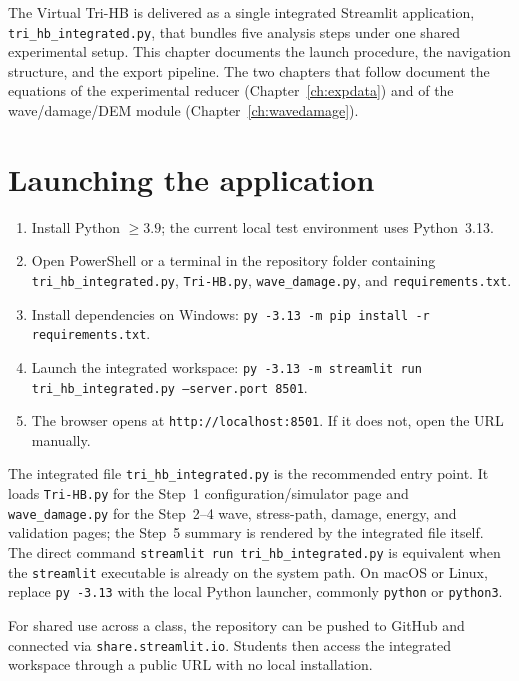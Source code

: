 \documentclass[11pt,a4paper,openany]{book}
\theoremstyle{handbook}
\begin{document}
The Virtual Tri-HB is delivered as a single integrated Streamlit
application, \texttt{tri\_hb\_integrated.py}, that bundles five analysis
steps under one shared experimental setup. This chapter documents the
launch procedure, the navigation structure, and the export pipeline. The
two chapters that follow document the equations of the experimental
reducer (Chapter~\ref{ch:expdata}) and of the wave/damage/DEM module
(Chapter~\ref{ch:wavedamage}).

\section{Launching the application}

\begin{stepbox}
\begin{enumerate}[leftmargin=*,itemsep=3pt]
  \item Install Python $\ge 3.9$; the current local test environment uses
        Python~3.13.
  \item Open PowerShell or a terminal in the repository folder containing
        \texttt{tri\_hb\_integrated.py}, \texttt{Tri-HB.py},
        \texttt{wave\_damage.py}, and \texttt{requirements.txt}.
  \item Install dependencies on Windows:
        \texttt{py -3.13 -m pip install -r requirements.txt}.
  \item Launch the integrated workspace:
        \texttt{py -3.13 -m streamlit run tri\_hb\_integrated.py --server.port 8501}.
  \item The browser opens at \texttt{http://localhost:8501}. If it does
        not, open the URL manually.
\end{enumerate}
\end{stepbox}

\noindent The integrated file \texttt{tri\_hb\_integrated.py} is the
recommended entry point. It loads \texttt{Tri-HB.py} for the Step~1
configuration/simulator page and \texttt{wave\_damage.py} for the Step~2--4
wave, stress-path, damage, energy, and validation pages; the Step~5 summary
is rendered by the integrated file itself. The direct command
\texttt{streamlit run tri\_hb\_integrated.py} is equivalent when the
\texttt{streamlit} executable is already on the system path. On macOS or
Linux, replace \texttt{py -3.13} with the local Python launcher, commonly
\texttt{python} or \texttt{python3}.

For shared use across a class, the repository can be pushed to GitHub and
connected via \texttt{share.streamlit.io}. Students then access the
integrated workspace through a public URL with no local installation.
\end{document}
